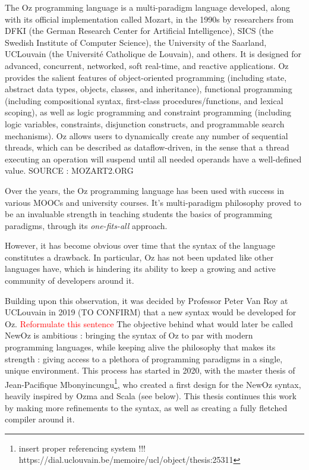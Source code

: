 
The Oz programming language is a multi-paradigm language developed, along with its official implementation called Mozart, in the 1990s by researchers from DFKI (the German Research Center for Artificial Intelligence), SICS (the Swedish Institute of Computer Science), the University of the Saarland, UCLouvain (the Université Catholique de Louvain), and others.
It is designed for advanced, concurrent, networked, soft real-time, and reactive applications.
Oz provides the salient features of object-oriented programming (including state, abstract data types, objects, classes, and inheritance),
functional programming (including compositional syntax, first-class procedures/functions, and lexical scoping), as well as
logic programming and constraint programming (including logic variables, constraints, disjunction constructs, and programmable search mechanisms).
Oz allows users to dynamically create any number of sequential threads, which can be described as dataflow-driven, in the sense that a thread executing an operation will suspend until all needed operands have a well-defined value.
SOURCE : MOZART2.ORG

Over the years, the Oz programming language has been used with success in various MOOCs and university courses.
It's multi-paradigm philosophy proved to be an invaluable strength in teaching students the basics of programming paradigms, through its \textit{one-fits-all} approach.

However, it has become obvious over time that the syntax of the language constitutes a drawback.
In particular, Oz has not been updated like other languages have, which is hindering its ability to keep a growing and active community of developers around it.

Building upon this observation, it was decided by Professor Peter Van Roy at UCLouvain in 2019 (TO CONFIRM) that a new syntax would be developed for Oz. \textcolor{red}{Reformulate this sentence}
The objective behind what would later be called NewOz is ambitious : bringing the syntax of Oz to par with modern programming languages, while keeping alive the philosophy that makes its strength : giving access to a plethora of programming paradigms in a single, unique environment.
This process has started in 2020, with the master thesis of Jean-Pacifique Mbonyincungu\footnote{insert proper referencing system !!! https://dial.uclouvain.be/memoire/ucl/object/thesis:25311}, who created a first design for the NewOz syntax, heavily inspired by Ozma and Scala (see below).
This thesis continues this work by making more refinements to the syntax, as well as creating a fully fletched compiler around it.

